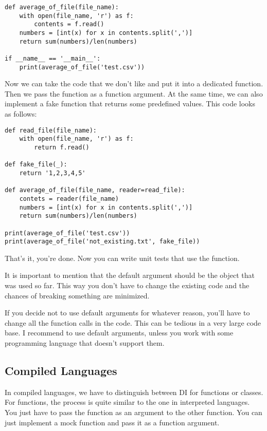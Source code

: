 \begin{programcode}{}
\begin{verbatim}
def average_of_file(file_name):
    with open(file_name, 'r') as f:
        contents = f.read()
    numbers = [int(x) for x in contents.split(',')]
    return sum(numbers)/len(numbers)

if __name__ == '__main__':
    print(average_of_file('test.csv'))
\end{verbatim}
\end{programcode}

Now we can take the code that we don't like and put it into a dedicated function. Then we pass the function as a function argument. At the same time, we can also implement a fake function that returns some predefined values. This code looks as follows:

\begin{programcode}{}
\begin{verbatim}
def read_file(file_name):
    with open(file_name, 'r') as f:
        return f.read()

def fake_file(_):
    return '1,2,3,4,5'

def average_of_file(file_name, reader=read_file):
    contets = reader(file_name)
    numbers = [int(x) for x in contents.split(',')]
    return sum(numbers)/len(numbers)

print(average_of_file('test.csv'))
print(average_of_file('not_existing.txt', fake_file))
\end{verbatim}
\end{programcode}

That's it, you're done. Now you can write unit tests that use the  function.

It is important to mention that the default argument should be the object that was used so far. This way you don't have to change the existing code and the chances of breaking something are minimized.

If you decide not to use default arguments for whatever reason, you'll have to change all the function calls in the code. This can be tedious in a very large code base. I recommend to use default arguments, unless you work with some programming language that doesn't support them.

\subsection{Compiled Languages}

In compiled languages, we have to distinguish between DI for functions or classes. For functions, the process is quite similar to the one in interpreted languages. You just have to pass the function as an argument to the other function. You can just implement a mock function and pass it as a function argument. 

